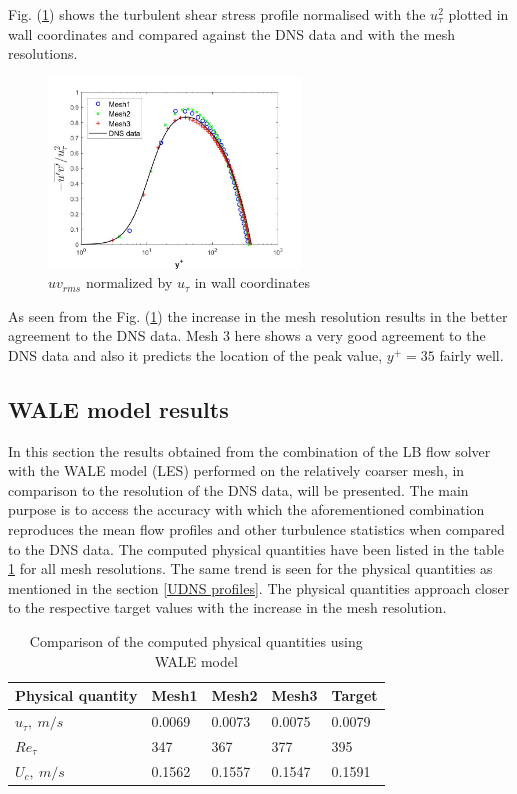Fig. (\ref{uvrms wall}) shows the turbulent shear stress profile normalised with the $u_\tau^2$ plotted in wall coordinates and compared against the DNS data and with the mesh resolutions.
\begin{figure}[h!]
    \centering
    \includegraphics[width=0.6\textwidth]{06_Resultsanddiscussion/figur/UDNS_2016/uv_rms_wall_coords.jpg}
    \caption{$uv_{rms}$ normalized by $u_\tau$ in wall coordinates}
    \label{uvrms wall}
\end{figure}

As seen from the Fig. (\ref{uvrms wall}) the increase in the mesh resolution results in the better agreement to the DNS data. Mesh 3 here shows a very good agreement to the DNS data and also it predicts the location of the peak value, $y^+ = 35$ fairly well.
\subsection{WALE model results}
In this section the results obtained from the combination of the LB flow solver with the WALE model (LES) performed on the relatively coarser mesh, in comparison to the resolution of the DNS data, will be presented. The main purpose is to access the accuracy with which the aforementioned combination reproduces the mean flow profiles and other turbulence statistics when compared to the DNS data. The computed physical quantities have been listed in the table \ref{Global quantities WALE} for all mesh resolutions. The same trend is seen for the physical quantities as mentioned in the section \ref{UDNS profiles}. The physical quantities approach closer to the respective target values with the increase in the mesh resolution. 
%
\begin{table}[h!]
\begin{center}
\begin{tabular}{ p{3cm}|p{1.5cm}p{1.5cm}p{1.5cm}p{1.5cm}  } 
\hline
Physical quantity & Mesh1 & Mesh2 & Mesh3 & Target \\
  \hline
  \multirow{1}{6em}{$u_\tau,\ m/s$}  & 0.0069 & 0.0073 & 0.0075 & 0.0079\\
  \hline
  \multirow{1}{6em}{$Re_\tau$} & 347 & 367 & 377 & 395\\
  \hline
  \multirow{1}{6em}{$U_c,\ m/s$} & 0.1562 & 0.1557 & 0.1547 & 0.1591\\
  \hline
\end{tabular}
\end{center}
\caption{Comparison of the computed physical quantities using WALE model}
\label{Global quantities WALE}
\end{table}
%
